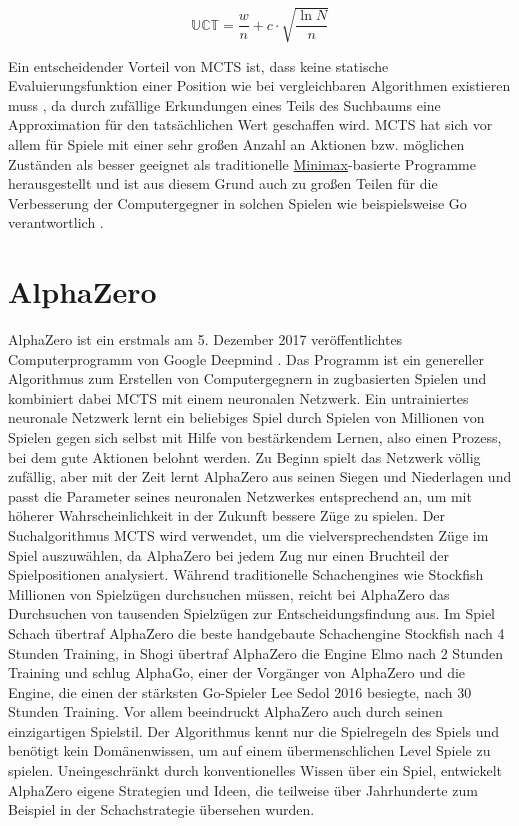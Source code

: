 \begin{equation}
    \label{eqn:uct}
    \mathbb{U}\mathbb{C}\mathbb{T} = \frac{w}{n} + c \cdot \sqrt{\frac{\ln N}{n}}
\end{equation}

Ein entscheidender Vorteil von \ac{MCTS} ist, dass keine statische Evaluierungsfunktion einer Position wie bei vergleichbaren Algorithmen existieren muss \cite[S. 61]{2008.ParallelMCTS}, da durch zufällige Erkundungen eines Teils des Suchbaums eine Approximation für den tatsächlichen Wert geschaffen wird. \ac{MCTS} hat sich vor allem für Spiele mit einer sehr großen Anzahl an Aktionen bzw. möglichen Zuständen als besser geeignet als traditionelle \hyperref[chapter:minimax-algorithmus]{Minimax}-basierte Programme herausgestellt \cite[S. 1]{2013.MCTSAndMinimaxHybrids} und ist aus diesem Grund auch zu großen Teilen für die Verbesserung der Computergegner in solchen Spielen wie beispielsweise Go verantwortlich \cite[S. 206]{2009.ComputerGoMCTS} \cite[S. 185]{2018.ReinforcementLearning}.

\section{AlphaZero}
\label{chapter:alphazero}

AlphaZero ist ein erstmals am 5. Dezember 2017 veröffentlichtes Computerprogramm von Google Deepmind \cite{2017.AlphaZero}. Das Programm ist ein genereller Algorithmus zum Erstellen von Computergegnern in zugbasierten Spielen und kombiniert dabei \ac{MCTS} mit einem neuronalen Netzwerk. Ein untrainiertes neuronale Netzwerk lernt ein beliebiges Spiel durch Spielen von Millionen von Spielen gegen sich selbst mit Hilfe von bestärkendem Lernen, also einen Prozess, bei dem gute Aktionen belohnt werden. Zu Beginn spielt das Netzwerk völlig zufällig, aber mit der Zeit lernt AlphaZero aus seinen Siegen und Niederlagen und passt die Parameter seines neuronalen Netzwerkes entsprechend an, um mit höherer Wahrscheinlichkeit in der Zukunft bessere Züge zu spielen. Der Suchalgorithmus \ac{MCTS} wird verwendet, um die vielversprechendsten Züge im Spiel auszuwählen, da AlphaZero bei jedem Zug nur einen Bruchteil der Spielpositionen analysiert. Während traditionelle Schachengines wie Stockfish Millionen von Spielzügen durchsuchen müssen, reicht bei AlphaZero das Durchsuchen von tausenden Spielzügen zur Entscheidungsfindung aus. Im Spiel Schach übertraf AlphaZero die beste handgebaute Schachengine Stockfish nach 4 Stunden Training, in Shogi übertraf AlphaZero die Engine Elmo nach 2 Stunden Training und schlug AlphaGo, einer der Vorgänger von AlphaZero und die Engine, die einen der stärksten Go-Spieler Lee Sedol 2016 besiegte, nach 30 Stunden Training. Vor allem beeindruckt AlphaZero auch durch seinen einzigartigen Spielstil. Der Algorithmus kennt nur die Spielregeln des Spiels und benötigt kein Domänenwissen, um auf einem übermenschlichen Level Spiele zu spielen. Uneingeschränkt durch konventionelles Wissen über ein Spiel, entwickelt AlphaZero eigene Strategien und Ideen, die teilweise über Jahrhunderte zum Beispiel in der Schachstrategie übersehen wurden. \cite{2018.AlphaZero}

